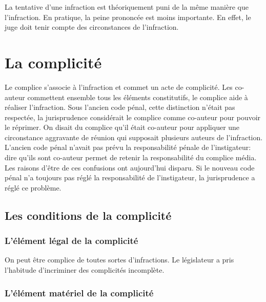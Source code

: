 \documentclass[10pt, a4paper, openany]{book}
\begin{document}
La tentative d'une infraction est théoriquement puni de la même manière que l'infraction. En pratique, la peine prononcée est moins importante. En effet, le juge doit tenir compte des circonstances de l'infraction. 

\section{La complicité}

Le complice s'associe à l'infraction et commet un acte de complicité. Les co-auteur commettent ensemble tous les éléments constitutifs, le complice aide à réaliser l'infraction. Sous l'ancien code pénal, cette distinction n'était pas respectée, la jurisprudence considérait le complice comme co-auteur pour pouvoir le réprimer. On disait du complice qu'il était co-auteur pour appliquer une circonstance aggravante de réunion qui supposait plusieurs auteurs de l'infraction. L'ancien code pénal n'avait pas prévu la responsabilité pénale de l'instigateur: dire qu'ils sont co-auteur permet de retenir la responsabilité du complice média. \\
Les raisons d'être de ces confusions ont aujourd'hui disparu. Si le nouveau code pénal n'a toujours pas réglé la responsabilité de l'instigateur, la jurisprudence a réglé ce problème. 

\subsection{Les conditions de la complicité}

\subsubsection{L'élément légal de la complicité}

On peut être complice de toutes sortes d'infractions. Le législateur a pris l'habitude d'incriminer des complicités incomplète. 

\subsubsection{L'élément matériel de la complicité}
\end{document}
